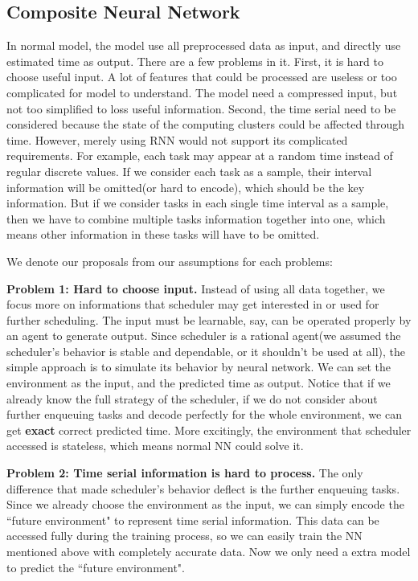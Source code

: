 \documentclass[conference,compsoc]{IEEEtran}
\begin{document}
\subsection{Composite Neural Network}
	In normal model, the model use all preprocessed data as input, and directly use estimated time as output. There are a few problems in it. First, it is hard to choose useful input. A lot of features that could be processed are useless or too complicated for model to understand. The model need a compressed input, but not too simplified to loss useful information. Second, the time serial need to be considered because the state of the computing clusters could be affected through time. However, merely using RNN would not support its complicated requirements. For example, each task may appear at a random time instead of regular discrete values. If we consider each task as a sample, their interval information will be omitted(or hard to encode), which should be the key information. But if we consider tasks in each single time interval as a sample,  then we have to combine multiple tasks information together into one, which  means other information in these tasks will have to be omitted. 
	
	We denote our proposals from our assumptions for each problems:
	
	\textbf{Problem 1: Hard to choose input.} Instead of using all data together, we focus more on informations that scheduler may get interested in or used for further scheduling. The input must be learnable, say, can be operated properly by an agent to generate output. Since scheduler is a rational agent(we assumed the scheduler's behavior is stable and dependable, or it shouldn't be used at all), the simple approach is to simulate its behavior by neural network. We can set the environment as the input, and the predicted time as output. Notice that if we already know the full strategy of the scheduler, if we do not consider about further enqueuing tasks and decode perfectly for the whole environment, we can get \textbf{exact} correct predicted time. More excitingly, the environment that scheduler accessed is stateless, which means normal NN could solve it.
	
	\textbf{Problem 2: Time serial information is hard to process.} The only difference that made scheduler's behavior deflect is the further enqueuing tasks. Since we already choose the environment as the input, we can simply encode the ``future environment" to represent time serial information. This data can be accessed fully during the training process, so we can easily train the NN mentioned above with completely accurate data. Now we only need a extra model to predict the ``future environment".
\end{document}
